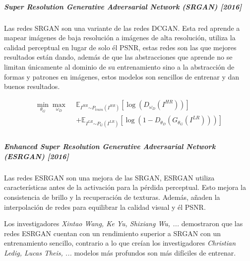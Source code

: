 \subparagraph{Super Resolution Generative Adversarial Network (SRGAN) [2016]}
Las redes \gls{SRGAN} \cite{SRGAN-ledig2017photorealistic} son una variante de las redes \gls{DCGAN}. Esta red aprende a mapear imágenes de baja resolución a imágenes de alta resolución, utiliza la calidad perceptual en lugar de solo él \gls{PSNR}, estas redes son las que mejores resultados están dando, además de que las abstracciones que aprende no se limitan únicamente al dominio de su entrenamiento sino a la abstracción de formas y patrones en imágenes, estos modelos son sencillos de entrenar y dan buenos resultados.

\begin{equation}
    \begin{split}
        \min_{\theta_{G}}\max_{\omega_{D}}~~
        & \mathbb{E}_{I^{H R} {\sim P_{train} (I^{H R})}}  \left[ \log{(D_{\omega_{D}}(I^{H R}))}                      \right]     \\
        & + \mathbb{E}_{I^{L R} {\sim P_{G} (I^{L R})}}    \left[ \log{( 1 - D_{\theta_{D}}(G_{\theta_{G}}(I^{L R})))} \right]     \\
    \end{split}
\end{equation}


\subparagraph{{\small Enhanced Super Resolution Generative Adversarial Network (ESRGAN) [2016]}}
Las redes \gls{ESRGAN} \cite{ESRGAN-wang2018esrgan, SRGAN-ledig2017photorealistic} son una mejora de las \gls{SRGAN}, \gls{ESRGAN} utiliza características antes de la activación para la pérdida perceptual. Esto mejora la consistencia de brillo y la recuperación de texturas. Además, añaden la interpolación de redes para equilibrar la calidad visual y él \gls{PSNR}.

Los investigadores \textit{Xintao Wang, Ke Yu, Shixiang Wu, ...}\cite{ESRGAN-wang2018esrgan} demostraron que las redes \gls{ESRGAN} cuentan con un rendimiento superior a \gls{SRGAN} con un entrenamiento sencillo, contrario a lo que creían los investigadores \textit{Christian Ledig, Lucas Theis, ...} \cite{SRGAN-ledig2017photorealistic} modelos más profundos son más difíciles de entrenar.



